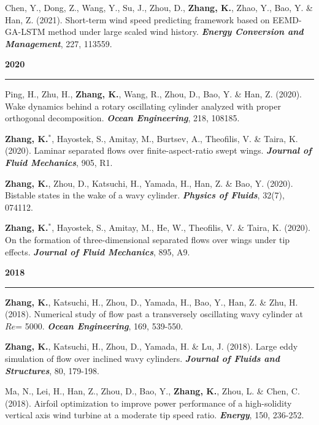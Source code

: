 \documentclass[10pt]{article}
\begin{document}
{\begin{etaremune}
  \item Chen, Y., Dong, Z., Wang, Y., Su, J., Zhou, D., \textbf{Zhang, K.}, Zhao, Y., Bao, Y. \& Han, Z. (2021). Short-term wind speed predicting framework based on EEMD-GA-LSTM method under large scaled wind history. \textit{\textbf{Energy Conversion and Management}}, 227, 113559.
  

 \item [] {\bf \color{Blue} 2020 \rule{14.8cm}{0.2mm}} 
 

  \item Ping, H., Zhu, H., \textbf{Zhang, K.}, Wang, R., Zhou, D., Bao, Y. \& Han, Z. (2020). Wake dynamics behind a rotary oscillating cylinder analyzed with proper orthogonal decomposition. \textit{\textbf{Ocean Engineering}}, 218, 108185.
  
  \item \textbf{Zhang, K.}$^*$, Hayostek, S., Amitay, M., Burtsev, A., Theofilis, V. \& Taira, K. (2020). Laminar separated flows over finite-aspect-ratio swept wings. \textit{\textbf{Journal of Fluid Mechanics}}, 905, R1.
  
  \item \textbf{Zhang, K.}, Zhou, D., Katsuchi, H., Yamada, H., Han, Z. \& Bao, Y. (2020). Bistable states in the wake of a wavy cylinder. \textit{\textbf{Physics of Fluids}}, 32(7), 074112.
  
  \item \textbf{Zhang, K.}$^*$, Hayostek, S., Amitay, M., He, W., Theofilis, V. \& Taira, K. (2020). On the formation of three-dimensional separated flows over wings under tip effects. \textit{\textbf{Journal of Fluid Mechanics}}, 895, A9.

 \item [] {\bf \color{Blue} 2018 \rule{14.8cm}{0.2mm}} 

  
  \item \textbf{Zhang, K.}, Katsuchi, H., Zhou, D., Yamada, H., Bao, Y., Han, Z. \& Zhu, H. (2018). Numerical study of flow past a transversely oscillating wavy cylinder at $Re$= 5000. \textit{\textbf{Ocean Engineering}}, 169, 539-550.
  
  \item \textbf{Zhang, K.}, Katsuchi, H., Zhou, D., Yamada, H. \& Lu, J. (2018). Large eddy simulation of flow over inclined wavy cylinders. \textit{\textbf{Journal of Fluids and Structures}}, 80, 179-198.
  
  \item Ma, N., Lei, H., Han, Z., Zhou, D., Bao, Y., \textbf{Zhang, K.}, Zhou, L. \& Chen, C. (2018). Airfoil optimization to improve power performance of a high-solidity vertical axis wind turbine at a moderate tip speed ratio. \textit{\textbf{Energy}}, 150, 236-252.
  

\end{etaremune}}
\end{document}
